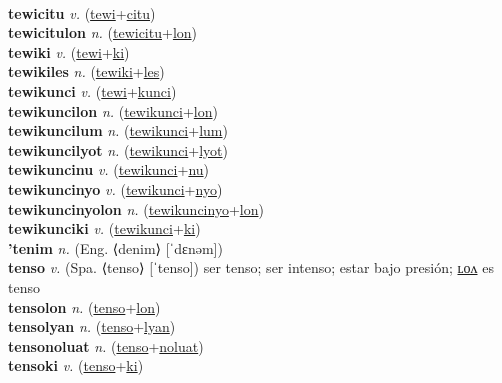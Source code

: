  \label{tewinyo} \\
\textbf{tewicitu} \textit{v.} (\hyperref[tewi]{tewi}+\hyperref[citu]{citu})
 \label{tewicitu} \\
\textbf{tewicitulon} \textit{n.} (\hyperref[tewicitu]{tewicitu}+\hyperref[lon]{lon})
 \label{tewicitulon} \\
\textbf{tewiki} \textit{v.} (\hyperref[tewi]{tewi}+\hyperref[ki]{ki})
 \label{tewiki} \\
\textbf{tewikiles} \textit{n.} (\hyperref[tewiki]{tewiki}+\hyperref[les]{les})
 \label{tewikiles} \\
\textbf{tewikunci} \textit{v.} (\hyperref[tewi]{tewi}+\hyperref[kunci]{kunci})
 \label{tewikunci} \\
\textbf{tewikuncilon} \textit{n.} (\hyperref[tewikunci]{tewikunci}+\hyperref[lon]{lon})
 \label{tewikuncilon} \\
\textbf{tewikuncilum} \textit{n.} (\hyperref[tewikunci]{tewikunci}+\hyperref[lum]{lum})
 \label{tewikuncilum} \\
\textbf{tewikuncilyot} \textit{n.} (\hyperref[tewikunci]{tewikunci}+\hyperref[lyot]{lyot})
 \label{tewikuncilyot} \\
\textbf{tewikuncinu} \textit{v.} (\hyperref[tewikunci]{tewikunci}+\hyperref[nu]{nu})
 \label{tewikuncinu} \\
\textbf{tewikuncinyo} \textit{v.} (\hyperref[tewikunci]{tewikunci}+\hyperref[nyo]{nyo})
 \label{tewikuncinyo} \\
\textbf{tewikuncinyolon} \textit{n.} (\hyperref[tewikuncinyo]{tewikuncinyo}+\hyperref[lon]{lon})
 \label{tewikuncinyolon} \\
\textbf{tewikunciki} \textit{v.} (\hyperref[tewikunci]{tewikunci}+\hyperref[ki]{ki})
 \label{tewikunciki} \\
\textbf{'tenim} \textit{n.} (Eng. ⟨denim⟩ [ˈdɛnəm])
 \label{'tenim} \\
\textbf{tenso} \textit{v.} (Spa. ⟨tenso⟩ [ˈtenso])
ser tenso; ser intenso; estar bajo presión; \hyperref[tensolon]{ʟᴏᴧ} es tenso \label{tenso} \\
\textbf{tensolon} \textit{n.} (\hyperref[tenso]{tenso}+\hyperref[lon]{lon})
 \label{tensolon} \\
\textbf{tensolyan} \textit{n.} (\hyperref[tenso]{tenso}+\hyperref[lyan]{lyan})
 \label{tensolyan} \\
\textbf{tensonoluat} \textit{n.} (\hyperref[tenso]{tenso}+\hyperref[noluat]{noluat})
 \label{tensonoluat} \\
\textbf{tensoki} \textit{v.} (\hyperref[tenso]{tenso}+\hyperref[ki]{ki})
